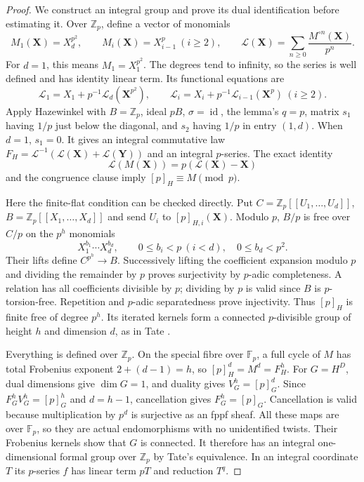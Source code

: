 \documentclass[11pt,a4paper]{article}
\theoremstyle{definition}\newtheorem{remark}[theorem]{Remark}
\newcommand{\Z}{\mathbb Z}\newcommand{\Q}{\mathbb Q}\newcommand{\F}{\mathbb F}
\newcommand{\id}{\operatorname{id}}\newcommand{\Hom}{\operatorname{Hom}}
\begin{document}
\begin{proof}
We construct an integral group and prove its dual identification before estimating it. Over $\Z_p$, define a vector of monomials
\[
 M_1(\mathbf X)=X_d^{p^2},\qquad M_i(\mathbf X)=X_{i-1}^p\ (i\ge2),
 \qquad \mathcal L(\mathbf X)=\sum_{n\ge0}\frac{M^{\circ n}(\mathbf X)}{p^n}.
\]
For $d=1$, this means $M_1=X_1^{p^2}$. The degrees tend to infinity, so the series is well defined and has identity linear term. Its functional equations are
\[
 \mathcal L_1=X_1+p^{-1}\mathcal L_d(\mathbf X^{p^2}),\qquad
 \mathcal L_i=X_i+p^{-1}\mathcal L_{i-1}(\mathbf X^p)\ (i\ge2).
\]
Apply Hazewinkel \cite[Lemma 2.3, (2.2)--(2.6), p.~74]{Hazewinkel} with $B=\Z_p$, ideal $pB$, $\sigma=\id$, the lemma's $q=p$, matrix $s_1$ having $1/p$ just below the diagonal, and $s_2$ having $1/p$ in entry $(1,d)$. When $d=1$, $s_1=0$. It gives an integral commutative law $F_H=\mathcal L^{-1}(\mathcal L(\mathbf X)+\mathcal L(\mathbf Y))$ and an integral $p$-series. The exact identity
\[
 \mathcal L(M(\mathbf X))=p(\mathcal L(\mathbf X)-\mathbf X)
\]
and the congruence clause \cite[(2.8), p.~75]{Hazewinkel} imply $[p]_H\equiv M\pmod p$.

Here the finite-flat condition can be checked directly. Put $C=\Z_p[[U_1,\ldots,U_d]]$, $B=\Z_p[[X_1,\ldots,X_d]]$ and send $U_i$ to $[p]_{H,i}(\mathbf X)$. Modulo $p$, $B/p$ is free over $C/p$ on the $p^h$ monomials
\[
 X_1^{b_1}\cdots X_d^{b_d},\qquad
 0\le b_i<p\ (i<d),\quad 0\le b_d<p^2.
\]
Their lifts define $C^{p^h}\to B$. Successively lifting the coefficient expansion modulo $p$ and dividing the remainder by $p$ proves surjectivity by $p$-adic completeness. A relation has all coefficients divisible by $p$; dividing by $p$ is valid since $B$ is $p$-torsion-free. Repetition and $p$-adic separatedness prove injectivity. Thus $[p]_H$ is finite free of degree $p^h$. Its iterated kernels form a connected $p$-divisible group of height $h$ and dimension $d$, as in Tate \cite[\S2.2, Proposition 1, pp.~162--164]{Tate67}.

Everything is defined over $\Z_p$. On the special fibre over $\F_p$, a full cycle of $M$ has total Frobenius exponent $2+(d-1)=h$, so $[p]_H^d=M^d=F_H^h$. For $G=H^D$, dual dimensions give $\dim G=1$, and duality gives $V_G^h=[p]_G^d$. Since $F_G^hV_G^h=[p]_G^h$ and $d=h-1$, cancellation gives $F_G^h=[p]_G$. Cancellation is valid because multiplication by $p^d$ is surjective as an fppf sheaf. All these maps are over $\F_p$, so they are actual endomorphisms with no unidentified twists. Their Frobenius kernels show that $G$ is connected. It therefore has an integral one-dimensional formal group over $\Z_p$ by Tate's equivalence. In an integral coordinate $T$ its $p$-series $f$ has linear term $pT$ and reduction $T^q$.


\end{proof}
\end{document}
